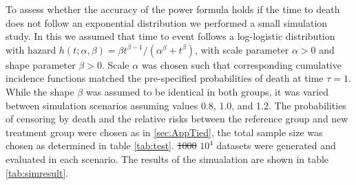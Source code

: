 \documentclass[bimj,fleqn]{w-art}\usepackage[]{graphicx}\usepackage[]{color}
\theoremstyle{plain}
\theoremstyle{definition}
\providecommand{\DIFdel}[1]{{\protect\color{red}\sout{#1}}}                      %
\providecommand{\DIFaddbegin}{} %
\providecommand{\DIFaddend}{} %
\providecommand{\DIFdelbegin}{} %
\providecommand{\DIFdelend}{} %
\newcommand{\DIFscaledelfig}{0.5}
\newlength{\DIFdelgraphicswidth} %
\newlength{\DIFdelgraphicsheight} %
\newcommand{\DIFaddincludegraphics}[2][]{{\color{blue}\fbox{\DIFOincludegraphics[#1]{#2}}}} %
\newcommand{\DIFdelincludegraphics}[2][]{%
\sbox{\DIFdelgraphicsbox}{\DIFOincludegraphics[#1]{#2}}%
\settoboxwidth{\DIFdelgraphicswidth}{\DIFdelgraphicsbox} %
\settoboxtotalheight{\DIFdelgraphicsheight}{\DIFdelgraphicsbox} %
\scalebox{\DIFscaledelfig}{%
\parbox[b]{\DIFdelgraphicswidth}{\usebox{\DIFdelgraphicsbox}\\[-\baselineskip] \rule{\DIFdelgraphicswidth}{0em}}\llap{\resizebox{\DIFdelgraphicswidth}{\DIFdelgraphicsheight}{%
\setlength{\unitlength}{\DIFdelgraphicswidth}%
\begin{picture}(1,1)%
\thicklines\linethickness{2pt} %
{\color[rgb]{1,0,0}\put(0,0){\framebox(1,1){}}}%
{\color[rgb]{1,0,0}\put(0,0){\line( 1,1){1}}}%
{\color[rgb]{1,0,0}\put(0,1){\line(1,-1){1}}}%
\end{picture}%
}\hspace*{3pt}}} %
} %
\DeclareRobustCommand{\DIFaddbegin}{\DIFOaddbegin \let\includegraphics\DIFaddincludegraphics} %
\DeclareRobustCommand{\DIFaddend}{\DIFOaddend \let\includegraphics\DIFOincludegraphics} %
\DeclareRobustCommand{\DIFdelbegin}{\DIFOdelbegin \let\includegraphics\DIFdelincludegraphics} %
\DeclareRobustCommand{\DIFdelend}{\DIFOaddend \let\includegraphics\DIFOincludegraphics} %
\begin{document}
To assess whether the accuracy of the power formula holds if the time to death
does not follow an exponential distribution we performed a small simulation
study. In this we assumed that time to event follows a log-logistic distribution
with hazard $h(t; \alpha, \beta) = \beta t^{\beta - 1} / (\alpha^{\beta} + t^{\beta})$,
with scale parameter $\alpha > 0 $ and shape parameter $\beta > 0$. Scale
$\alpha$ was chosen such that corresponding cumulative incidence functions
matched the pre-specified probabilities of death at time $\tau = 1$. While the
shape $\beta$ was assumed to be identical in both groups, it was varied between
simulation scenarios assuming values 0.8, 1.0, and 1.2.
The probabilities of censoring by death and the relative risks between the
reference group and new treatment group were chosen as in \ref{sec:AppTied}, the
total sample size was chosen as determined in table \ref{tab:test}. \DIFdelbegin \DIFdel{1000 }\DIFdelend \DIFaddbegin \ensuremath{10^{4}}
\DIFaddend datasets were generated and evaluated in each scenario. The results of the
simualation are shown in table \ref{tab:simresult}.
\end{document}
